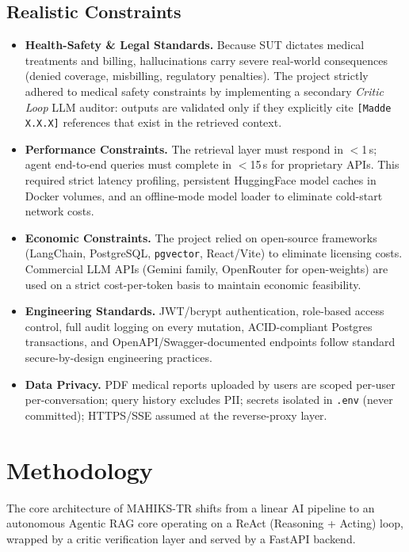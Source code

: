 \documentclass[11pt, a4paper]{article}
\begin{document}
\subsection{Realistic Constraints}

\begin{itemize}[leftmargin=*]
    \item \textbf{Health-Safety \& Legal Standards.} Because SUT dictates medical treatments and billing, hallucinations carry severe real-world consequences (denied coverage, misbilling, regulatory penalties). The project strictly adhered to medical safety constraints by implementing a secondary \textit{Critic Loop} LLM auditor: outputs are validated only if they explicitly cite \texttt{[Madde X.X.X]} references that exist in the retrieved context.
    \item \textbf{Performance Constraints.} The retrieval layer must respond in $<$1\,s; agent end-to-end queries must complete in $<$15\,s for proprietary APIs. This required strict latency profiling, persistent HuggingFace model caches in Docker volumes, and an offline-mode model loader to eliminate cold-start network costs.
    \item \textbf{Economic Constraints.} The project relied on open-source frameworks (LangChain, PostgreSQL, \texttt{pgvector}, React/Vite) to eliminate licensing costs. Commercial LLM APIs (Gemini family, OpenRouter for open-weights) are used on a strict cost-per-token basis to maintain economic feasibility.
    \item \textbf{Engineering Standards.} JWT/bcrypt authentication, role-based access control, full audit logging on every mutation, ACID-compliant Postgres transactions, and OpenAPI/Swagger-documented endpoints follow standard secure-by-design engineering practices.
    \item \textbf{Data Privacy.} PDF medical reports uploaded by users are scoped per-user per-conversation; query history excludes PII; secrets isolated in \texttt{.env} (never committed); HTTPS/SSE assumed at the reverse-proxy layer.
\end{itemize}

\section{Methodology}

The core architecture of MAHIKS-TR shifts from a linear AI pipeline to an autonomous Agentic RAG core operating on a ReAct (Reasoning + Acting) loop, wrapped by a critic verification layer and served by a FastAPI backend.
\end{document}
